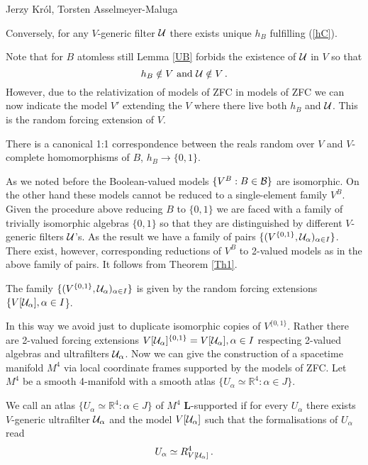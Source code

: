 \begin{artengenv2auth}{Jerzy Kr\'ol, Torsten Asselmeyer-Maluga}
\begin{Lemma}
Conversely, for any $V$-generic filter ${\cal U}$ there exists unique $h_B$ fulfilling (\ref{hC}).
\end{Lemma}
Note that for $B$ atomless still Lemma \ref{UB} forbids the existence of ${\cal U}$ in $V$ so that \[h_B\notin V \text{ and } {\cal U}\notin V\,. \] 
However, due to the relativization of models of ZFC in models of ZFC we can now indicate the model $V'$ extending the $V$ where there live both $h_B$ and ${\cal U}$. This is the random forcing extension of $V$.
\begin{Theorem}\parencite[p.36]{Solovay1970}\label{Th1}
There is a canonical 1:1 correspondence between the reals random over $V$ and $V$-complete homomorphisms of $B$, $h_B\to \{0,1\}$.
\end{Theorem}
As we noted before the Boolean-valued models $\{V^B: B\in {\cal B}\}$ are isomorphic. On the other hand these models cannot be reduced to a single-element family $V^B$. Given the procedure above reducing $B$ to $\{0,1\}$ we are faced with a family of trivially isomorphic algebras $\{0,1\}$ so that they are distinguished by different $V$-generic filters ${\cal U}$'s. As the result we have a family of pairs $\{(V^{\{0,1\}},{\cal U}_{\alpha})_{\alpha\in I}\} $. There exist, however, corresponding reductions of $V^B$ to 2-valued models as in the above family of pairs. It follows from Theorem \ref{Th1}.
\begin{Lemma}
The family $\{(V^{\{0,1\}},{\cal U}_{\alpha})_{\alpha\in I}\} $ is given by the random forcing extensions $\{ V[{\cal U}_{\alpha}], \alpha\in I$\}.  
\end{Lemma}
In this way we avoid just to duplicate isomorphic copies of $V^{\{0,1\}}$. Rather there are 2-valued forcing extensions $V[{\cal U}_{\alpha}]^{\{0,1\}}=V[{\cal U}_{\alpha}], \alpha\in I$ respecting 2-valued algebras and ultrafilters ${\cal U}_{\alpha}$.
Now we can give the construction of a spacetime manifold $M^4$ via local coordinate frames supported by the models of ZFC. Let $M^4$ be a smooth 4-manifold with a smooth atlas $\{ U_{\alpha}\simeq \mathbb{R}^4:\alpha \in J \}$.
\begin{Definition}\label{def1}
We call an atlas $\{ U_{\alpha}\simeq \mathbb{R}^4:\alpha \in J \}$ of $M^4$ {\bf L}-supported if for every $U_{\alpha}$ there exists $V$-generic ultrafilter ${\cal U}_{\alpha}$ and the model $V[{\cal U}_{\alpha}]$ such that the formalisations of $U_{\alpha}$ read
\begin{equation}\label{F} U_{\alpha}\simeq R^4_{V[{\cal U}_{\alpha}]}\,. \end{equation}

\end{Definition}
\end{artengenv2auth}
